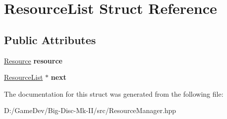 \hypertarget{struct_resource_list}{}\section{Resource\+List Struct Reference}
\label{struct_resource_list}
\subsection*{Public Attributes}
\begin{DoxyCompactItemize}
\item 
\mbox{\label{struct_resource_list_a6123d8b13c69685f2b8ac3fbe737f168}} 
\mbox{\hyperlink{struct_resource}{Resource}} {\bfseries resource}
\item 
\mbox{\label{struct_resource_list_add4ed1b0f63df2be0f02bbd0568e116b}} 
\mbox{\hyperlink{struct_resource_list}{Resource\+List}} $\ast$ {\bfseries next}
\end{DoxyCompactItemize}


The documentation for this struct was generated from the following file\+:\begin{DoxyCompactItemize}
\item 
D\+:/\+Game\+Dev/\+Big-\/\+Disc-\/\+Mk-\/\+I\+I/src/Resource\+Manager.\+hpp\end{DoxyCompactItemize}
